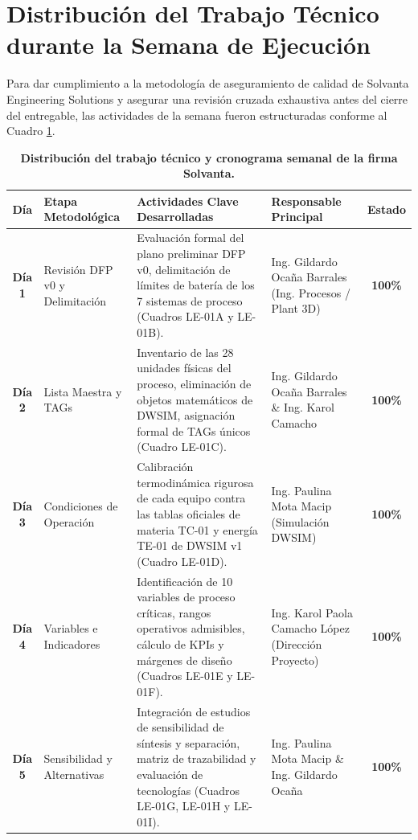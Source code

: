 \documentclass[10pt,letterpaper]{article}
\begin{document}
\section{Distribución del Trabajo Técnico durante la Semana de Ejecución}

Para dar cumplimiento a la metodología de aseguramiento de calidad de Solvanta Engineering Solutions y asegurar una revisión cruzada exhaustiva antes del cierre del entregable, las actividades de la semana fueron estructuradas conforme al Cuadro \ref{tab:cuadro2}.

\begin{table}[H]
\centering
\small
\setlength{\tabcolsep}{4pt}
\caption{\textbf{Distribución del trabajo técnico y cronograma semanal de la firma Solvanta.}} \label{tab:cuadro2}
\begin{tabularx}{\textwidth}{c p{3.0cm} X p{3.6cm} c}
\toprule
\textbf{Día} & \textbf{Etapa Metodológica} & \textbf{Actividades Clave Desarrolladas} & \textbf{Responsable Principal} & \textbf{Estado} \\
\midrule
\textbf{Día 1} & Revisión DFP v0 y Delimitación & Evaluación formal del plano preliminar DFP v0, delimitación de límites de batería de los 7 sistemas de proceso (Cuadros LE-01A y LE-01B). & Ing. Gildardo Ocaña Barrales (Ing. Procesos / Plant 3D) & \textbf{100\%} \\
\textbf{Día 2} & Lista Maestra y TAGs & Inventario de las 28 unidades físicas del proceso, eliminación de objetos matemáticos de DWSIM, asignación formal de TAGs únicos (Cuadro LE-01C). & Ing. Gildardo Ocaña Barrales \& Ing. Karol Camacho & \textbf{100\%} \\
\textbf{Día 3} & Condiciones de Operación & Calibración termodinámica rigurosa de cada equipo contra las tablas oficiales de materia TC-01 y energía TE-01 de DWSIM v1 (Cuadro LE-01D). & Ing. Paulina Mota Macip (Simulación DWSIM) & \textbf{100\%} \\
\textbf{Día 4} & Variables e Indicadores & Identificación de 10 variables de proceso críticas, rangos operativos admisibles, cálculo de KPIs y márgenes de diseño (Cuadros LE-01E y LE-01F). & Ing. Karol Paola Camacho López (Dirección Proyecto) & \textbf{100\%} \\
\textbf{Día 5} & Sensibilidad y Alternativas & Integración de estudios de sensibilidad de síntesis y separación, matriz de trazabilidad y evaluación de tecnologías (Cuadros LE-01G, LE-01H y LE-01I). & Ing. Paulina Mota Macip \& Ing. Gildardo Ocaña & \textbf{100\%} \\

\end{tabularx}
\end{table}
\end{document}
